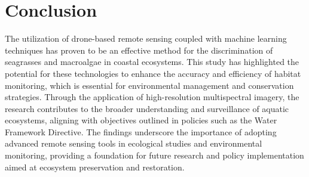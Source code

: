 \documentclass[
  number]{elsarticle}
\begin{document}
\section{Conclusion}\label{conclusion}

The utilization of drone-based remote sensing coupled with machine
learning techniques has proven to be an effective method for the
discrimination of seagrasses and macroalgae in coastal ecosystems. This
study has highlighted the potential for these technologies to enhance
the accuracy and efficiency of habitat monitoring, which is essential
for environmental management and conservation strategies. Through the
application of high-resolution multispectral imagery, the research
contributes to the broader understanding and surveillance of aquatic
ecosystems, aligning with objectives outlined in policies such as the
Water Framework Directive. The findings underscore the importance of
adopting advanced remote sensing tools in ecological studies and
environmental monitoring, providing a foundation for future research and
policy implementation aimed at ecosystem preservation and restoration.


  
\end{document}
